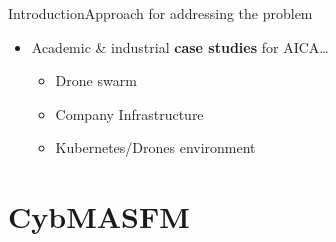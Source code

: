 \begin{frame}{Introduction}{Approach for addressing the problem}
\begin{itemize}
        \item Academic \& industrial \textbf{case studies} for AICA\dots
              \begin{itemize}
                  \item Drone swarm
                  \item Company Infrastructure
                  \item Kubernetes/Drones environment
              \end{itemize}

    \end{itemize}

\end{frame}

\section{CybMASFM}

